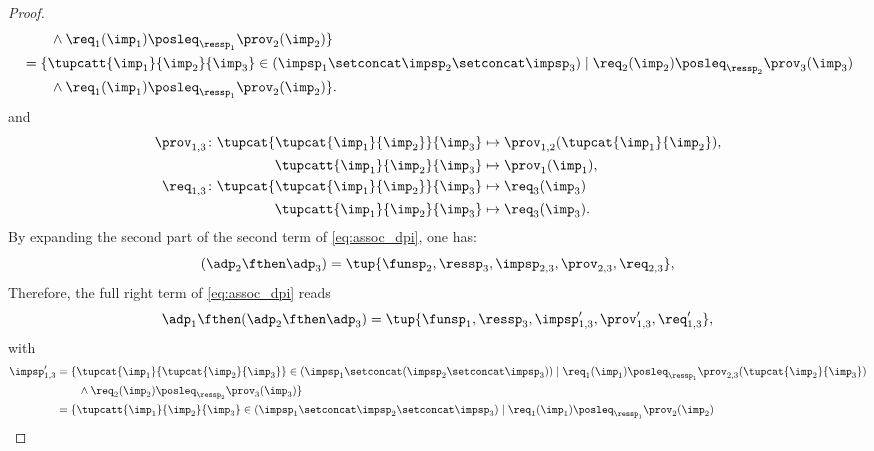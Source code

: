 \begin{proof}
\begin{equation}
\begin{aligned}
            &\qquad \wedge \req_{1}(\imp_{1})\posleq_{\ressp_1}\prov_2(\imp_2)\}\\
            &=\{  \tupcatt{\imp_{1}}{\imp_{2}}{\imp_{3}} \in (\impsp_{1} \setconcat \impsp_{2}\setconcat \impsp_{3})\mid\req_{2}(\imp_2)\posleq_{\ressp_{2}}\prov_{3}(\imp_{3})\\
            &\qquad \wedge \req_{1}(\imp_{1})\posleq_{\ressp_1}\prov_2(\imp_2)\}.
        \end{aligned}
    \end{equation}
    and
    \begin{equation}
        \begin{aligned}
            \prov_{1,3} \colon \tupcat {\tupcat {\imp_{1}} {\imp_{2}}} {\imp_{3}}   &\mapsto\prov_{1,2}(\tupcat {\imp_{1}} {\imp_{2}}),\\
            \tupcatt{\imp_{1}}{\imp_{2}}{\imp_{3}}&\mapsto \prov_1(\imp_{1}),\\
            \req_{1,3} \colon \tupcat {\tupcat {\imp_{1}} {\imp_{2}}} {\imp_{3}} &\mapsto\req_{3}(\imp_{3})\\
            \tupcatt{\imp_{1}}{\imp_{2}}{\imp_{3}}&\mapsto\req_{3}(\imp_{3}).
        \end{aligned}
    \end{equation}
    By expanding the second part of the second term of \cref{eq:assoc_dpi}, one has:
    \begin{equation}
    (\adp_{2} \fthen \adp_{3})
        =
        \tup{ \funsp_{2},\ressp_{3},\impsp_{2,3},\prov_{2,3},\req_{2,3}},
    \end{equation}
    Therefore, the full right term of \cref{eq:assoc_dpi} reads
    \begin{equation}
        \label{eq:dpi_ass_2}
        \adp_{1} \fthen (\adp_{2}\fthen \adp_{3})=\tup{ \funsp_{1},\ressp_{3},\impsp'_{1,3},\prov'_{1,3},\req'_{1,3}},
    \end{equation}
    with
    \begin{equation}
        \begin{aligned}
            \impsp_{1,3}'  &=  \{  \tupcat {\imp_{1}} {\tupcat {\imp_{2}} {\imp_{3}}} \in (\impsp_{1} \setconcat (\impsp_{2}\setconcat \impsp_{3}))\mid\req_{1}(\imp_{1})\posleq_{\ressp_{1}}\prov_{2,3}(\tupcat {\imp_{2}} {\imp_{3}})\\
            &\qquad \wedge \req_2(\imp_2)\posleq_{\ressp_2}\prov_3(\imp_3)\}\\
            &=\{  \tupcatt{\imp_{1}}{\imp_{2}}{\imp_{3}} \in (\impsp_{1} \setconcat \impsp_{2}\setconcat \impsp_{3})\mid\req_{1}(\imp_{1})\posleq_{\ressp_{1}}\prov_{2}(\imp_2)\\

\end{aligned}
\end{equation}
\end{proof}
